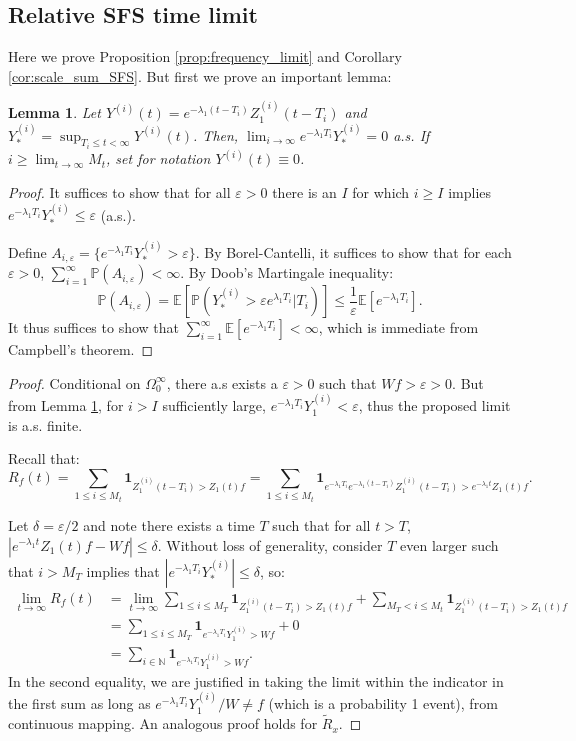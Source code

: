 \documentclass{article}
\numberwithin{equation}{section}
\newtheorem{lemma}{Lemma}
\begin{document}
\subsection{Relative SFS time limit}\label{app:frequency_limit}
Here we prove Proposition \ref{prop:frequency_limit} and Corollary \ref{cor:scale_sum_SFS}. But first we prove an important lemma:
\begin{lemma}
     Let $Y^{(i)}(t)=e^{-\lambda_1(t-T_i)}Z_1^{(i)}(t-T_i)$ and $Y_*^{(i)}=\sup_{T_i\leq t<\infty} Y^{(i)}(t)$. Then, $\lim_{i\to\infty} e^{-\lambda_1 T_i}Y_*^{(i)}=0$ a.s. If $i\geq \lim_{t\to\infty}M_t$, set for notation $Y^{(i)}(t)\equiv 0$\label{lem:Y_small}.
\end{lemma}

\begin{proof}
    It suffices to show that for all $\varepsilon>0$ there is an $I$ for which $i\geq I$ implies $e^{-\lambda_1 T_i}Y_*^{(i)}\leq \varepsilon$ (a.s.).

    Define $A_{i,\varepsilon}=\{e^{-\lambda_1 T_i}Y_*^{(i)}>\varepsilon\}$. By Borel-Cantelli, it suffices to show that for each $\varepsilon>0$, $\sum_{i=1}^\infty \mathbb{P}(A_{i,\varepsilon})<\infty$. By Doob's Martingale inequality:
\[
\mathbb{P}(A_{i,\varepsilon})=\mathbb{E}[\mathbb{P}(Y_*^{(i)}>\varepsilon e^{\lambda_1 T_i}|T_i)]\leq \frac{1}{\varepsilon}\mathbb{E}[e^{-\lambda_1 T_i}].
\]
It thus suffices to show that $\sum_{i=1}^\infty \mathbb{E}\left[e^{-\lambda_1 T_i}\right]<\infty$, which is immediate from Campbell's theorem.
\end{proof}

\FrequencyLimit*
\begin{proof}
  Conditional on $\Omega_0^\infty$, there a.s exists a $\varepsilon>0$ such that $Wf>\varepsilon>0$. But from Lemma \ref{lem:Y_small}, for $i>I$ sufficiently large, $e^{-\lambda_1 T_i}Y_1^{(i)}<\varepsilon $, thus the proposed limit is a.s. finite.
  
  Recall that:
  \[
  R_f(t)=\sum_{1\leq i\leq M_t} \mathbf{1}_{Z_1^{(i)}(t-T_i)>Z_1(t)f}=\sum_{1\leq i\leq M_t} \mathbf{1}_{e^{-\lambda_1 T_i}e^{-\lambda_1(t-T_i)}Z_1^{(i)}(t-T_i)>e^{-\lambda_1 t}Z_1(t)f}.
  \]

  Let $\delta=\varepsilon/2$ and note there exists a time $T$ such that for all $t>T$, $|e^{-\lambda_1 t}Z_1(t)f-Wf|\leq \delta$. Without loss of generality, consider $T$ even larger such that $i>M_T$ implies that $|e^{-\lambda_1 T_i}Y_*^{(i)}|\leq \delta$, so:
  \begin{align*}
    \lim_{t\to\infty} R_f(t)&=\lim_{t\to\infty} \sum_{1\leq i\leq M_T} \mathbf{1}_{Z_1^{(i)}(t-T_i)>Z_1(t)f}+\sum_{M_T< i\leq M_t} \mathbf{1}_{Z_1^{(i)}(t-T_i)>Z_1(t)f}\\
    &=\sum_{1\leq i\leq M_T}\mathbf{1}_{e^{-\lambda_1 T_i}Y_1^{(i)}>Wf}+0\\
    &=\sum_{i\in \mathbb{N}}\mathbf{1}_{e^{-\lambda_1 T_i}Y_1^{(i)}>Wf}.
  \end{align*}
In the second equality, we are justified in taking the limit within the indicator in the first sum as long as $e^{-\lambda_1 T_i}Y_1^{(i)}/W\neq f$ (which is a probability 1 event), from continuous mapping. An analogous proof holds for $\widetilde{R}_x$.
\end{proof}
\end{document}
